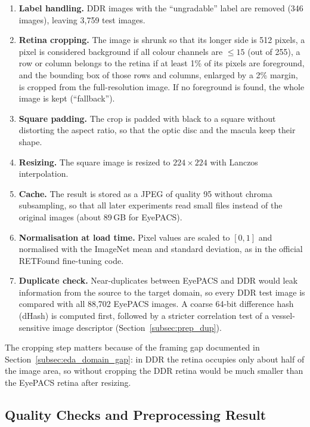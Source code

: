 \begin{enumerate}[leftmargin=1.8em]
    \item \textbf{Label handling.} DDR images with the ``ungradable'' label are removed (346 images), leaving 3{,}759 test images.
    \item \textbf{Retina cropping.} The image is shrunk so that its longer side is 512 pixels, a pixel is considered background if all colour channels are $\le 15$ (out of 255), a row or column belongs to the retina if at least 1\% of its pixels are foreground, and the bounding box of those rows and columns, enlarged by a 2\% margin, is cropped from the full-resolution image. If no foreground is found, the whole image is kept (``fallback'').
    \item \textbf{Square padding.} The crop is padded with black to a square without distorting the aspect ratio, so that the optic disc and the macula keep their shape.
    \item \textbf{Resizing.} The square image is resized to $224\times224$ with Lanczos interpolation.
    \item \textbf{Cache.} The result is stored as a JPEG of quality 95 without chroma subsampling, so that all later experiments read small files instead of the original images (about 89\,GB for EyePACS).
    \item \textbf{Normalisation at load time.} Pixel values are scaled to $[0,1]$ and normalised with the ImageNet mean and standard deviation, as in the official RETFound fine-tuning code.
    \item \textbf{Duplicate check.} Near-duplicates between EyePACS and DDR would leak information from the source to the target domain, so every DDR test image is compared with all 88{,}702 EyePACS images. A coarse 64-bit difference hash (dHash) is computed first, followed by a stricter correlation test of a vessel-sensitive image descriptor (Section~\ref{subsec:prep_dup}).
\end{enumerate}

The cropping step matters because of the framing gap documented in Section~\ref{subsec:eda_domain_gap}: in DDR the retina occupies only about half of the image area, so without cropping the DDR retina would be much smaller than the EyePACS retina after resizing.

\subsection{Quality Checks and Preprocessing Result}
\label{subsec:prep_qa}

